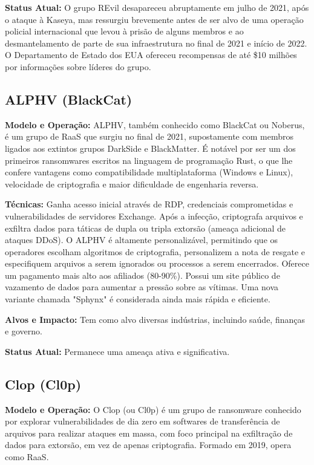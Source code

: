 \textbf{Status Atual:} O grupo REvil desapareceu abruptamente em julho de 2021, após o ataque à Kaseya, mas ressurgiu brevemente antes de ser alvo de uma operação policial internacional que levou à prisão de alguns membros e ao desmantelamento de parte de sua infraestrutura no final de 2021 e início de 2022. O Departamento de Estado dos EUA ofereceu recompensas de até \$10 milhões por informações sobre líderes do grupo.

\subsection{ALPHV (BlackCat)}
\textbf{Modelo e Operação:} ALPHV, também conhecido como BlackCat ou Noberus, é um grupo de RaaS que surgiu no final de 2021, supostamente com membros ligados aos extintos grupos DarkSide e BlackMatter. É notável por ser um dos primeiros ransomwares escritos na linguagem de programação Rust, o que lhe confere vantagens como compatibilidade multiplataforma (Windows e Linux), velocidade de criptografia e maior dificuldade de engenharia reversa.

\textbf{Técnicas:} Ganha acesso inicial através de RDP, credenciais comprometidas e vulnerabilidades de servidores Exchange. Após a infecção, criptografa arquivos e exfiltra dados para táticas de dupla ou tripla extorsão (ameaça adicional de ataques DDoS). O ALPHV é altamente personalizável, permitindo que os operadores escolham algoritmos de criptografia, personalizem a nota de resgate e especifiquem arquivos a serem ignorados ou processos a serem encerrados. Oferece um pagamento mais alto aos afiliados (80-90\%). Possui um site público de vazamento de dados para aumentar a pressão sobre as vítimas. Uma nova variante chamada "Sphynx" é considerada ainda mais rápida e eficiente.

\textbf{Alvos e Impacto:} Tem como alvo diversas indústrias, incluindo saúde, finanças e governo.

\textbf{Status Atual:} Permanece uma ameaça ativa e significativa.

\subsection{Clop (Cl0p)}
\textbf{Modelo e Operação:} O Clop (ou Cl0p) é um grupo de ransomware conhecido por explorar vulnerabilidades de dia zero em softwares de transferência de arquivos para realizar ataques em massa, com foco principal na exfiltração de dados para extorsão, em vez de apenas criptografia. Formado em 2019, opera como RaaS.

